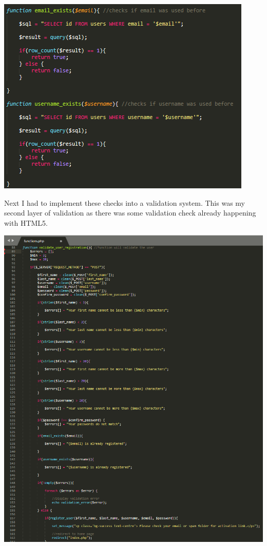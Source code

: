 \includegraphics[width=\textwidth,height=\textheight,keepaspectratio]{img/emain-user-check.png}

Next I had to implement these checks into a validation system. This was my second layer of validation as there was some validation check already happening with HTML5.

\includegraphics[width=\textwidth,height=\textheight,keepaspectratio]{img/validationRegister.png}

